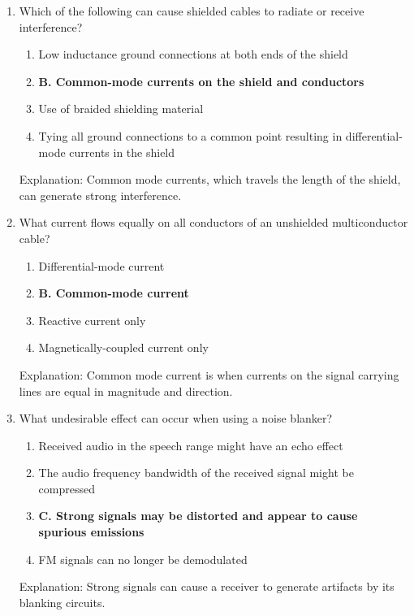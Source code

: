 \begin{enumerate}
    \item Which of the following can cause shielded cables to radiate or receive interference?
      \begin{enumerate}
          \item  Low inductance ground connections at both ends of the shield
       \item \textbf{B. Common-mode currents on the shield and conductors}
        \item  Use of braided shielding material
     \item  Tying all ground connections to a common point resulting in differential-mode currents in the shield
     \end{enumerate}
        \textcolor{myred}{Explanation:}
         Common mode currents, which travels the length of the shield, can generate strong interference.

     \item What current flows equally on all conductors of an unshielded multiconductor cable?
        \begin{enumerate}
      \item  Differential-mode current
          \item \textbf{B. Common-mode current}
         \item  Reactive current only
       \item  Magnetically-coupled current only
        \end{enumerate}
     \textcolor{myred}{Explanation:}
      Common mode current is when currents on the signal carrying lines are equal in magnitude and direction.

    \item What undesirable effect can occur when using a noise blanker?
        \begin{enumerate}
          \item  Received audio in the speech range might have an echo effect
         \item  The audio frequency bandwidth of the received signal might be compressed
      \item \textbf{C. Strong signals may be distorted and appear to cause spurious emissions}
       \item  FM signals can no longer be demodulated
      \end{enumerate}
       \textcolor{myred}{Explanation:}
       Strong signals can cause a receiver to generate artifacts by its blanking circuits.
       

\end{enumerate}
